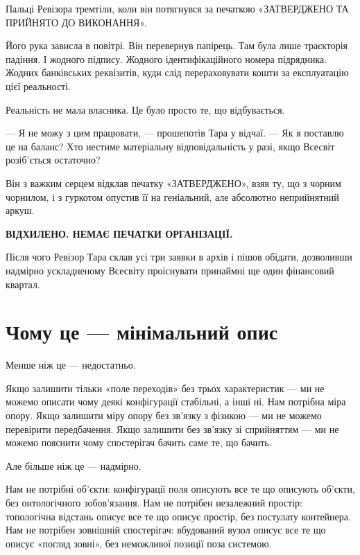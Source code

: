 \documentclass[12pt, a4paper, openany]{book}
\begin{document}
\begin{terrybox}
Пальці Ревізора тремтіли, коли він потягнувся за печаткою «ЗАТВЕРДЖЕНО ТА ПРИЙНЯТО ДО ВИКОНАННЯ».

Його рука зависла в повітрі. Він перевернув папірець. Там була лише траєкторія падіння. І жодного підпису. Жодного ідентифікаційного номера підрядника. Жодних банківських реквізитів, куди слід перераховувати кошти за експлуатацію цієї реальності.

Реальність не мала власника. Це було просто те, що відбувається.

--- Я не можу з цим працювати, --- прошепотів Тара у відчаї. --- Як я поставлю це на баланс? Хто нестиме матеріальну відповідальність у разі, якщо Всесвіт розіб'ється остаточно?

Він з важким серцем відклав печатку «ЗАТВЕРДЖЕНО», взяв ту, що з чорним чорнилом, і з гуркотом опустив її на геніальний, але абсолютно неприйнятний аркуш.

\medskip
\begin{center}\textbf{ВІДХИЛЕНО. НЕМАЄ ПЕЧАТКИ ОРГАНІЗАЦІЇ.}\end{center}

\medskip
Після чого Ревізор Тара склав усі три заявки в архів і пішов обідати, дозволивши надмірно ускладненому Всесвіту проіснувати принаймні ще один фінансовий квартал.
\end{terrybox}

\section{Чому це — мінімальний опис}

Менше ніж це --- недостатньо.

Якщо залишити тільки «поле переходів» без трьох характеристик --- ми не можемо описати чому деякі конфігурації стабільні, а інші ні. Нам потрібна міра опору. Якщо залишити міру опору без зв'язку з фізикою --- ми не можемо перевірити передбачення. Якщо залишити без зв'язку зі сприйняттям --- ми не можемо пояснити чому спостерігач бачить саме те, що бачить.

Але більше ніж це --- надмірно.

Нам не потрібні об'єкти: конфігурації поля описують все те що описують об'єкти, без онтологічного зобов'язання. Нам не потрібен незалежний простір: топологічна відстань описує все те що описує простір, без постулату контейнера. Нам не потрібен зовнішній спостерігач: вбудований вузол описує все те що описує «погляд зовні», без неможливої позиції поза системою.
\end{document}
